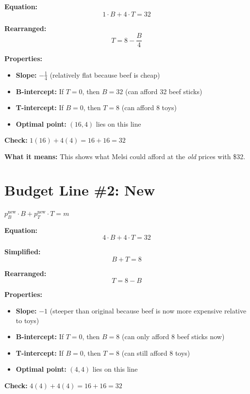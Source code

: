 \documentclass[12pt]{article}
\begin{document}
\textbf{Equation:}
$$1 \cdot B + 4 \cdot T = 32$$

\textbf{Rearranged:}
$$T = 8 - \frac{B}{4}$$

\textbf{Properties:}
\begin{itemize}
    \item \textbf{Slope:} $-\frac{1}{4}$ (relatively flat because beef is cheap)
    \item \textbf{B-intercept:} If $T=0$, then $B = 32$ (can afford 32 beef sticks)
    \item \textbf{T-intercept:} If $B=0$, then $T = 8$ (can afford 8 toys)
    \item \textbf{Optimal point:} $(16, 4)$ lies on this line
\end{itemize}

\textbf{Check:} $1(16) + 4(4) = 16 + 16 = 32$ \checkmark

\vspace{1em}

\textbf{What it means:} This shows what Melsi could afford at the \textit{old} prices with \$32.

\newpage

\section*{Budget Line \#2: New}

\begin{center}
\colorbox{red!20}{
\Large
$p_B^{\text{new}} \cdot B + p_T^{\text{new}} \cdot T = m$
}
\end{center}

\textbf{Equation:}
$$4 \cdot B + 4 \cdot T = 32$$

\textbf{Simplified:}
$$B + T = 8$$

\textbf{Rearranged:}
$$T = 8 - B$$

\textbf{Properties:}
\begin{itemize}
    \item \textbf{Slope:} $-1$ (steeper than original because beef is now more expensive relative to toys)
    \item \textbf{B-intercept:} If $T=0$, then $B = 8$ (can only afford 8 beef sticks now)
    \item \textbf{T-intercept:} If $B=0$, then $T = 8$ (can still afford 8 toys)
    \item \textbf{Optimal point:} $(4, 4)$ lies on this line
\end{itemize}

\textbf{Check:} $4(4) + 4(4) = 16 + 16 = 32$ \checkmark
\end{document}
